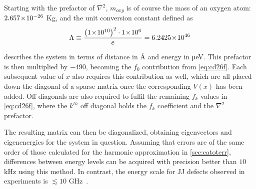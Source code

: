 Starting with the prefactor of $\nabla^2$, $m_{oxy}$ is of course the mass of an oxygen atom: $2.657\!\times\!10^{-26}$ Kg, and the unit conversion constant defined as
\begin{equation}
    \Lambda \equiv \frac{\left(1\!\times\!10^{10}\right)^2\cdot1\!\times\!10^{6}}{e} = 6.2425\!\times\!10^{46}\label{eq:lambda}
\end{equation}

describes the system in terms of distance in Å and energy in μeV.
This prefactor is then multiplied by $-490$, becoming the $f_0$ contribution from \cref{eq:cd26f}.
Each subsequent value of $x$ also requires this contribution as well, which are all placed down the diagonal of a sparse matrix once the corresponding $V(x)$ has been added.
Off diagonals are also required to fulfil the remaining $f_k$ values in \cref{eq:cd26f}, where the $k^{th}$ off diagonal holds the $f_k$ coefficient and the  $\nabla^2$ prefactor.

The resulting matrix can then be diagonalized, obtaining eigenvectors and eigenenergies for the system in question.
Assuming that errors are of the same order of those calculated for the harmonic approximation in \cref{sec:catoterr}, differences between energy levels can be acquired with precision better than $10$ kHz using this method.
In contrast, the energy scale for JJ defects observed in experiments is $\lesssim 10$ GHz~\cite{Neeley2008, Lupascu2009, Lisenfeld2010}.

